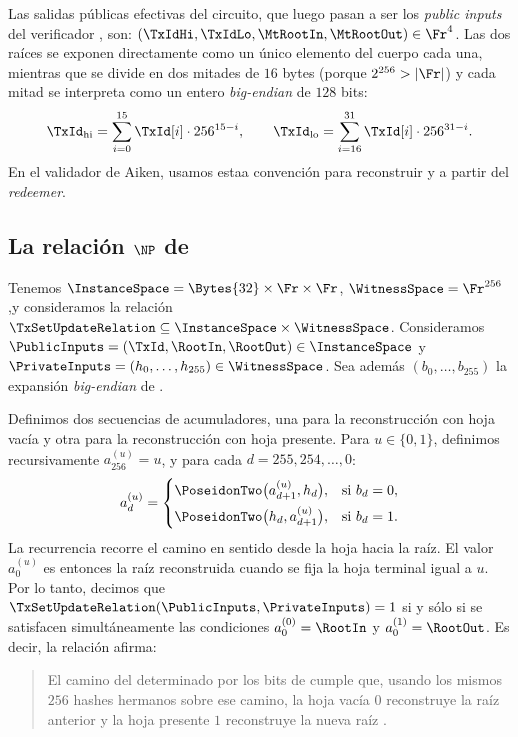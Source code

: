 Las salidas públicas efectivas del circuito, que luego pasan a ser los \textit{public inputs} del verificador \Groth \Onchain, son: $\left(\TxIdHi, \TxIdLo, \MtRootIn, \MtRootOut\right) \in \Fr^4$. Las dos raíces se exponen directamente como un único elemento del cuerpo cada una, mientras que \TxId se divide en dos mitades de $16$ bytes (porque $2^{256} > |\Fr|$) y cada mitad se interpreta como un entero \textit{big-endian} de $128$ bits:
$$\TxId_{\mathrm{hi}} = \sum_{i=0}^{15} \TxId[i]\cdot 256^{15-i}, \qquad \TxId_{\mathrm{lo}} = \sum_{i=16}^{31} \TxId[i]\cdot 256^{31-i}.$$
En el validador de Aiken, usamos estaa convención para reconstruir \TxIdHi y \TxIdLo a partir del \textit{redeemer}.

\subsection{La relación \texorpdfstring{\(\NP\)}{NP} de \TxSetUpdateCircuit}

Tenemos $\InstanceSpace = \Bytes{32} \times \Fr \times \Fr$, $\WitnessSpace = \Fr^{256}$,y consideramos la relación
$\TxSetUpdateRelation \subseteq \InstanceSpace \times \WitnessSpace$. Consideramos $\PublicInputs = (\TxId, \RootIn, \RootOut) \in \InstanceSpace$ y $\PrivateInputs = (h_0,\ldots,h_{255}) \in \WitnessSpace$. Sea además $(b_0,\ldots,b_{255})$ la expansión \textit{big-endian} de \TxId.

Definimos dos secuencias de acumuladores, una para la reconstrucción con hoja vacía y otra para la reconstrucción con hoja presente. Para $u \in \{0,1\}$, definimos recursivamente $a_{256}^{(u)} = u$, y para cada $d = 255,254,\ldots,0$:
$$a_d^{(u)} =
	\begin{cases}
 		\PoseidonTwo\bigl(a_{d+1}^{(u)}, h_d\bigr), & \text{si } b_d = 0,\\[4pt]
 		\PoseidonTwo\bigl(h_d, a_{d+1}^{(u)}\bigr), & \text{si } b_d = 1.
	\end{cases}$$
La recurrencia recorre el camino en sentido desde la hoja hacia la raíz. El valor $a_0^{(u)}$ es entonces la raíz reconstruida cuando se fija la hoja terminal igual a $u$. Por lo tanto, decimos que $\TxSetUpdateRelation(\PublicInputs, \PrivateInputs) = 1$ si y sólo si se satisfacen simultáneamente las condiciones $a_0^{(0)} = \RootIn$ y $a_0^{(1)} = \RootOut$. Es decir, la relación \TxSetUpdateRelation afirma:

\begin{quote}
El camino del \SMT determinado por los bits de \TxId cumple que, usando los mismos $256$ hashes hermanos sobre ese camino, la hoja vacía $0$ reconstruye la raíz anterior \RootIn y la hoja presente $1$ reconstruye la nueva raíz \RootOut.
\end{quote}

